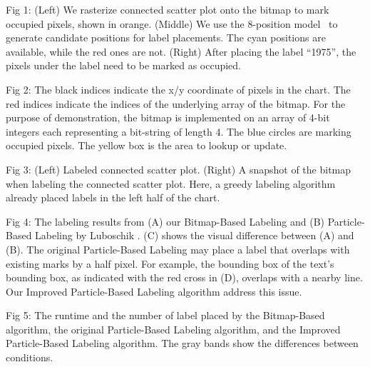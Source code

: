 Fig 1:
(Left) We rasterize connected scatter plot onto the bitmap to mark occupied pixels, shown in orange.
(Middle) We use the 8-position model~\cite{imhof1975positioning} to generate candidate positions for label placements.
The cyan positions are available, while the red ones are not.
(Right) After placing the label ``1975'', the pixels under the label need to be marked as occupied.

Fig 2:
The black indices indicate the x/y coordinate of pixels in the chart.
The red indices indicate the indices of the underlying array of the bitmap.
For the purpose of demonstration, the bitmap is implemented on an array of 4-bit integers each representing a bit-string of length 4.
The blue circles are marking occupied pixels.
The yellow box is the area to lookup or update.

Fig 3:
(Left) Labeled connected scatter plot.
(Right) A snapshot of the bitmap when labeling the connected scatter plot. Here, a greedy labeling algorithm already placed labels in the left half of the chart.

Fig 4:
The labeling results from (A) our Bitmap-Based Labeling and (B) Particle-Based Labeling by Luboschik \ea \cite{luboschik:particle}.
(C) shows the visual difference between (A) and (B).
The original Particle-Based Labeling may place a label that overlaps with existing marks by a half pixel. For example, the bounding box of the text's bounding box, as indicated with the red cross in (D), overlaps with a nearby line. 
Our Improved Particle-Based Labeling algorithm address this issue.

Fig 5:
The runtime and the number of label placed by the Bitmap-Based algorithm, the original Particle-Based Labeling algorithm, and the Improved Particle-Based Labeling algorithm.
The gray bands show the differences between conditions.
